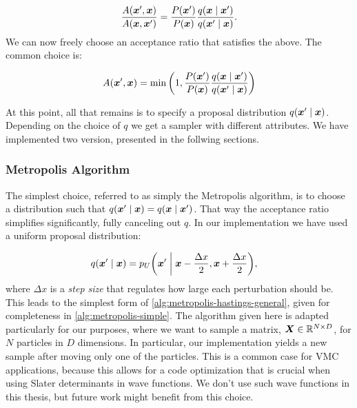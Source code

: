 \documentclass[Thesis.tex]{subfiles}
\begin{document}
\begin{align}
  \frac{A\qty(\bm{x}',\bm{x})}{A\qty(\bm{x},\bm{x}')} = \frac{P\qty(\bm{x}')}{P\qty(\bm{x})}\frac{q\qty(\bm{x}\;\middle|\;\bm{x}')}{q\qty(\bm{x}'\;\middle|\;\bm{x})}.
\end{align}
We can now freely choose an acceptance ratio that satisfies the above. The
common choice is:

\begin{align}
  A\qty(\bm{x}',\bm{x}) = \min\qty(1, \frac{P\qty(\bm{x}')}{P\qty(\bm{x})}\frac{q\qty(\bm{x}\;\middle|\;\bm{x}')}{q\qty(\bm{x}'\;\middle|\;\bm{x})})
\end{align}

At this point, all that remains is to specify a proposal distribution
$q\qty(\bm{x}'\;\middle|\;\bm{x})$. Depending on the choice of $q$ we get a sampler with
different attributes. We have implemented two version, presented in the follwing
sections.

\subsubsection{Metropolis Algorithm}

The simplest choice, referred to as simply the Metropolis algorithm, is to
choose a distribution such that
$q\qty(\bm{x}'\;\middle|\;\bm{x})=q\qty(\bm{x}\;\middle|\;\bm{x}')$. That way the acceptance
ratio simplifies significantly, fully canceling out $q$. In our implementation
we have used a uniform proposal distribution:

\begin{align}
  q\qty(\bm{x}' \;\middle|\; \bm{x}) &= p_U\qty(\bm{x}' \;\middle|\; \bm{x} -\frac{\Delta x}{2}, \bm{x} + \frac{\Delta x}{2}),
\end{align}
where $\Delta x$ is a \emph{step size} that regulates how large each
perturbation should be. This leads to the simplest form of
\cref{alg:metropolis-hastings-general}, given for completeness in
\cref{alg:metropolis-simple}. The algorithm given here is adapted particularly
for our purposes, where we want to sample a matrix, $\bm{X}\in\mathbb{R}^{N\times D}$, for $N$ particles in $D$ dimensions. In particular,
our implementation yields a new sample after moving only one of the particles.
This is a common case for VMC applications, because this allows for a code
optimization that is crucial when using Slater determinants in wave functions.
We don't use such wave functions in this thesis, but future work might benefit
from this choice.
\end{document}

